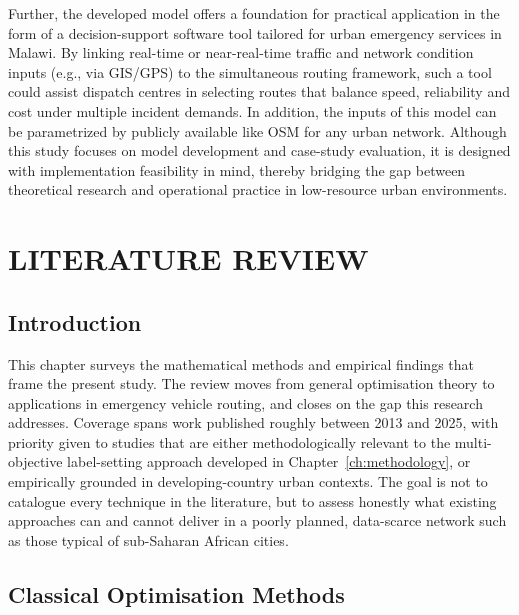 \documentclass[paper=A4, 12pt, mathscr]{report}
\begin{document}
	Further, the developed model offers a foundation for practical application in the form of a decision-support software tool tailored for urban emergency services in Malawi. By linking real-time or near-real-time traffic and network condition inputs (e.g., via GIS/GPS) to the simultaneous routing framework, such a tool could assist dispatch centres in selecting routes that balance speed, reliability and cost under multiple incident demands. In addition, the inputs of this model can be parametrized by publicly available like OSM for any urban network. Although this study focuses on model development and case-study evaluation, it is designed with implementation feasibility in mind, thereby bridging the gap between theoretical research and operational practice in low-resource urban environments.
	
	\chapter{LITERATURE REVIEW}
	\label{ch:litreview}
	
	\section{Introduction}
	\label{sec:lit_intro}
	
	This chapter surveys the mathematical methods and empirical findings that
	frame the present study. The review moves from general optimisation theory
	to applications in emergency vehicle routing, and closes on the gap this
	research addresses. Coverage spans work published roughly between 2013 and
	2025, with priority given to studies that are either methodologically
	relevant to the multi-objective label-setting approach developed in
	Chapter~\ref{ch:methodology}, or empirically grounded in developing-country
	urban contexts. The goal is not to catalogue every technique in the
	literature, but to assess honestly what existing approaches can and cannot
	deliver in a poorly planned, data-scarce network such as those typical of
	sub-Saharan African cities.
	
	
	\section{Classical Optimisation Methods}
	\label{sec:lit_theory}
	
\end{document}
